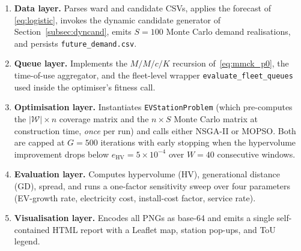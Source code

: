 \documentclass[conference]{IEEEtran}
\begin{document}
\begin{enumerate}
\item \textbf{Data layer.} Parses ward and candidate CSVs, applies the
      forecast of \eqref{eq:logistic}, invokes the dynamic candidate
      generator of Section~\ref{subsec:dyncand}, emits $S{=}100$
      Monte Carlo demand realisations, and persists
      \texttt{future\_demand.csv}.
\item \textbf{Queue layer.} Implements the $M/M/c/K$ recursion
      of~\eqref{eq:mmck_p0}, the time-of-use aggregator, and the
      fleet-level wrapper \texttt{evaluate\_fleet\_queues} used inside
      the optimiser's fitness call.
\item \textbf{Optimisation layer.} Instantiates \texttt{EVStationProblem}
      (which pre-computes the $|\mathcal{W}|\!\times\!n$ coverage matrix
      and the $n\!\times\!S$ Monte Carlo matrix at construction time,
      \emph{once} per run) and calls either NSGA-II or MOPSO.
      Both are capped at $G{=}500$ iterations with early stopping when
      the hypervolume improvement drops below
      $e_{\text{HV}}{=}5\!\times\!10^{-4}$ over $W{=}40$ consecutive
      windows.
\item \textbf{Evaluation layer.} Computes hypervolume (HV), generational
      distance (GD), spread, and runs a one-factor sensitivity sweep
      over four parameters (EV-growth rate, electricity cost, install-cost
      factor, service rate).
\item \textbf{Visualisation layer.} Encodes all PNGs as base-64 and
      emits a single self-contained HTML report with a Leaflet map,
      station pop-ups, and ToU legend.
\end{enumerate}
\end{document}
